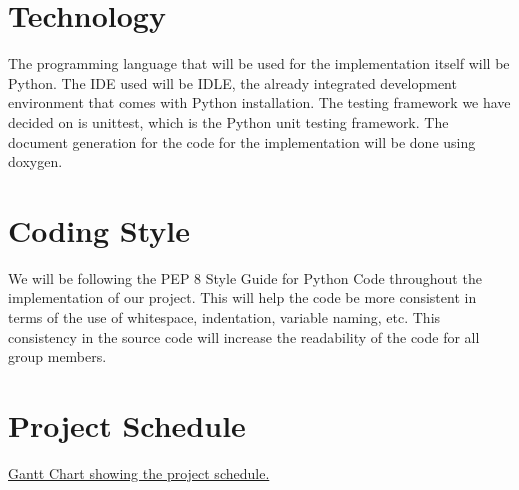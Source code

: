 \documentclass[12pt]{article}
\begin{document}
\section{Technology}

\tab The programming language that will be used for the implementation itself will be Python. The IDE used will be IDLE, the already integrated development environment that comes with Python installation. The testing framework we have decided on is unittest, which is the Python unit testing framework. The document generation for the code for the implementation will be done using doxygen. 

\section{Coding Style}

\tab We will be following the PEP 8 Style Guide for Python Code throughout the implementation of our project. This will help the code be more consistent in terms of the use of whitespace, indentation, variable naming, etc. This consistency in the source code will increase the readability of the code for all group members.

\section{Project Schedule}

   \href{3XA3 Gantt Chart.pdf}{Gantt Chart showing the project schedule.}
\end{document}

